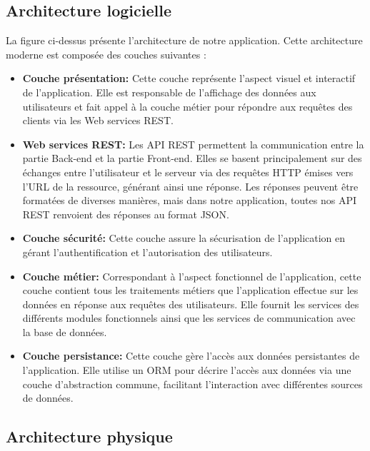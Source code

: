 \subsection{Architecture logicielle}
La figure ci-dessus présente l'architecture de notre application. Cette architecture moderne est composée des couches suivantes :
\vspace{0.5 cm}
\begin{itemize}



 \item \textbf{Couche présentation:} Cette couche représente l'aspect visuel et interactif de l'application. Elle est responsable de l'affichage des données aux utilisateurs et fait appel à la couche métier pour répondre aux requêtes des clients via les Web services REST.

 \item \textbf{Web services REST:} Les API REST permettent la communication entre la partie Back-end et la partie Front-end. Elles se basent principalement sur des échanges entre l'utilisateur et le serveur via des requêtes HTTP émises vers l'URL de la ressource, générant ainsi une réponse. Les réponses peuvent être formatées de diverses manières, mais dans notre application, toutes nos API REST renvoient des réponses au format JSON.

 \item \textbf{Couche sécurité:} Cette couche assure la sécurisation de l'application en gérant l'authentification et l'autorisation des utilisateurs.

 \item \textbf{Couche métier:} Correspondant à l'aspect fonctionnel de l'application, cette couche contient tous les traitements métiers que l'application effectue sur les données en réponse aux requêtes des utilisateurs. Elle fournit les services des différents modules fonctionnels ainsi que les services de communication avec la base de données.

 \item \textbf{Couche persistance:} Cette couche gère l'accès aux données persistantes de l'application. Elle utilise un ORM pour décrire l'accès aux données via une couche d'abstraction commune, facilitant l'interaction avec différentes sources de données.
\end{itemize}
\vspace{1 cm}

\subsection{Architecture physique}

